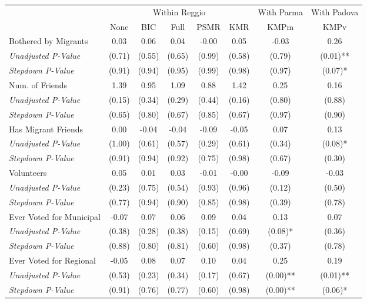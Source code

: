 \begin{tabular}{l c c c c c c c}
\toprule
& \multicolumn{5}{c}{Within Reggio} & With Parma & With Padova \\\cmidrule(lr){2-6} \cmidrule(lr){7-7} \cmidrule(lr){8-8}
 & None & BIC & Full & PSMR & KMR & KMPm & KMPv \\
\midrule
Bothered by Migrants & 0.03 & 0.06 & 0.04 & -0.00 & 0.05 & -0.03 & 0.26 \\
\quad \textit{Unadjusted P-Value} & (0.71) & (0.55) & (0.65) & (0.99) & (0.58) & (0.79) & (0.01)** \\
\quad \textit{Stepdown P-Value} & (0.91) & (0.94) & (0.95) & (0.99) & (0.98) & (0.97) & (0.07)* \\
Num. of Friends & 1.39 & 0.95 & 1.09 & 0.88 & 1.42 & 0.25 & 0.16 \\
\quad \textit{Unadjusted P-Value} & (0.15) & (0.34) & (0.29) & (0.44) & (0.16) & (0.80) & (0.88) \\
\quad \textit{Stepdown P-Value} & (0.65) & (0.80) & (0.67) & (0.85) & (0.67) & (0.97) & (0.90) \\
Has Migrant Friends & 0.00 & -0.04 & -0.04 & -0.09 & -0.05 & 0.07 & 0.13 \\
\quad \textit{Unadjusted P-Value} & (1.00) & (0.61) & (0.57) & (0.29) & (0.61) & (0.34) & (0.08)* \\
\quad \textit{Stepdown P-Value} & (0.91) & (0.94) & (0.92) & (0.75) & (0.98) & (0.67) & (0.30) \\
Volunteers & 0.05 & 0.01 & 0.03 & -0.01 & -0.00 & -0.09 & -0.03 \\
\quad \textit{Unadjusted P-Value} & (0.23) & (0.75) & (0.54) & (0.93) & (0.96) & (0.12) & (0.50) \\
\quad \textit{Stepdown P-Value} & (0.77) & (0.94) & (0.90) & (0.85) & (0.98) & (0.39) & (0.78) \\
Ever Voted for Municipal & -0.07 & 0.07 & 0.06 & 0.09 & 0.04 & 0.13 & 0.07 \\
\quad \textit{Unadjusted P-Value} & (0.38) & (0.28) & (0.38) & (0.15) & (0.69) & (0.08)* & (0.36) \\
\quad \textit{Stepdown P-Value} & (0.88) & (0.80) & (0.81) & (0.60) & (0.98) & (0.37) & (0.78) \\
Ever Voted for Regional & -0.05 & 0.08 & 0.07 & 0.10 & 0.04 & 0.25 & 0.19 \\
\quad \textit{Unadjusted P-Value} & (0.53) & (0.23) & (0.34) & (0.17) & (0.67) & (0.00)** & (0.01)** \\
\quad \textit{Stepdown P-Value} & (0.91) & (0.76) & (0.77) & (0.60) & (0.98) & (0.00)** & (0.06)* \\
\bottomrule
\end{tabular}
